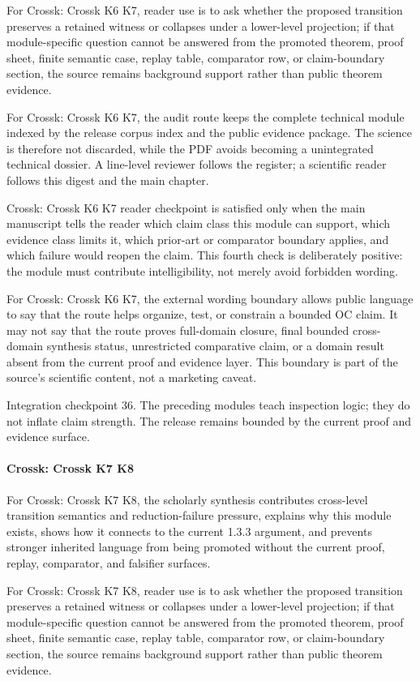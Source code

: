 For Crossk: Crossk K6 K7, reader use is to ask whether the proposed transition preserves a retained witness or collapses under a lower-level projection; if that module-specific question cannot be answered from the promoted theorem, proof sheet, finite semantic case, replay table, comparator row, or claim-boundary section, the source remains background support rather than public theorem evidence.


For Crossk: Crossk K6 K7, the audit route keeps the complete technical module indexed by the release corpus index and the public evidence package. The science is therefore not discarded, while the PDF avoids becoming a unintegrated technical dossier. A line-level reviewer follows the register; a scientific reader follows this digest and the main chapter.


Crossk: Crossk K6 K7 reader checkpoint is satisfied only when the main manuscript tells the reader which claim class this module can support, which evidence class limits it, which prior-art or comparator boundary applies, and which failure would reopen the claim. This fourth check is deliberately positive: the module must contribute intelligibility, not merely avoid forbidden wording.


For Crossk: Crossk K6 K7, the external wording boundary allows public language to say that the route helps organize, test, or constrain a bounded OC claim. It may not say that the route proves full-domain closure, final bounded cross-domain synthesis status, unrestricted comparative claim, or a domain result absent from the current proof and evidence layer. This boundary is part of the source's scientific content, not a marketing caveat.


Integration checkpoint 36. The preceding modules teach inspection logic; they do not inflate claim strength. The release remains bounded by the current proof and evidence surface.


\paragraph{Crossk: Crossk K7 K8}

For Crossk: Crossk K7 K8, the scholarly synthesis contributes cross-level transition semantics and reduction-failure pressure, explains why this module exists, shows how it connects to the current 1.3.3 argument, and prevents stronger inherited language from being promoted without the current proof, replay, comparator, and falsifier surfaces.


For Crossk: Crossk K7 K8, reader use is to ask whether the proposed transition preserves a retained witness or collapses under a lower-level projection; if that module-specific question cannot be answered from the promoted theorem, proof sheet, finite semantic case, replay table, comparator row, or claim-boundary section, the source remains background support rather than public theorem evidence.


